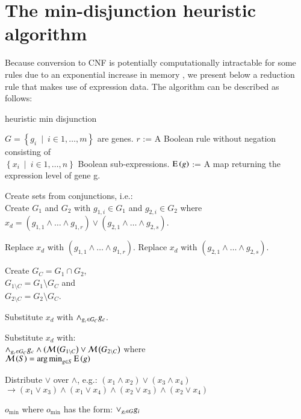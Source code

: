 \section{The min-disjunction heuristic algorithm}
\label{sec:HeuristicToCNF}
Because conversion to CNF is potentially computationally intractable 
for some rules due to an  exponential increase in memory \citep{Russell2009}, we
present below a reduction rule that makes use of expression data.
The algorithm can be described as follows:

\begin{algorithm} 
\caption{heuristic min disjunction}
\label{alg:HeuristicToCNF}
\begin{algorithmic}
\INPUT $G = \left\{g_i~\mid~i \in{1, \ldots, m}\right\}$ are genes. 
\INPUT $r$ := A Boolean rule without negation consisting of\\
  $\left\{x_i~\mid~i \in{1, \ldots, n}\right\}$ Boolean sub-expressions.
\INPUT $\operatorname{E}\left(g\right)$ := A map returning the expression level of gene g.
  \State \parbox[t]{\dimexpr\linewidth-\algorithmicindent}{
    Create sets from conjunctions, i.e.:\\
    Create $G_1$ and $G_2$ with $g_{1,i} \in G_1$ 
    and $g_{2,i} \in G_2$ where\\ 
    $x_d = (g_{1,1} \land \ldots \land g_{1,r}) \lor 
    (g_{2,1} \land \ldots \land g_{2,s})$. 
    \strut}
    \State Replace $x_d$ with $(g_{1,1} \land \ldots \land g_{1,r})$.
    \State Replace $x_d$ with $(g_{2,1} \land \ldots \land g_{2,s})$.
    \Else
    \State \parbox[t]{\dimexpr\linewidth-\algorithmicindent}{
      Create $G_C = G_1 \cap G_2$, \\
      $G_{1\setminus C} = G_1 \setminus G_C$ and\\ 
      $G_{2\setminus C} = G_2 \setminus G_C$. 
      \strut}
        \State Substitute $x_d$ with $\land_{g_c \in G_C} g_c$.
      \Else
        \State \parbox[t]{\dimexpr\linewidth-\algorithmicindent}{Substitute $x_d$ with:\\
          $\land_{g_c \in G_C} g_c \land (\mathcal{M}\left(G_{1 \setminus C}\right) \lor 
          \mathcal{M}\left(G_{2\setminus C}\right)$ where\\
          $\mathcal{M}\left(S\right) = \operatorname*{arg\,min}_{g \in S}{\operatorname{E}\left(g\right)}$
          \strut}
      \EndIf
    \EndIf
  \EndIf
  \State \parbox[t]{\dimexpr\linewidth-\algorithmicindent}{
    Distribute $\lor$ over $\land$, e.g.: $(x_1 \land x_2) \lor (x_3 \land x_4)$ \\ 
    $\rightarrow (x_1 \lor x_3) \land (x_1 \lor x_4) \land 
    (x_2 \lor x_3) \land (x_2 \lor x_4)$
    \strut}
\EndWhile
\OUTPUT $o_{\min}$ where $o_{\min}$ has the form: $\lor_{g_i \in G} g_i$
\end{algorithmic} 
\end{algorithm} 

